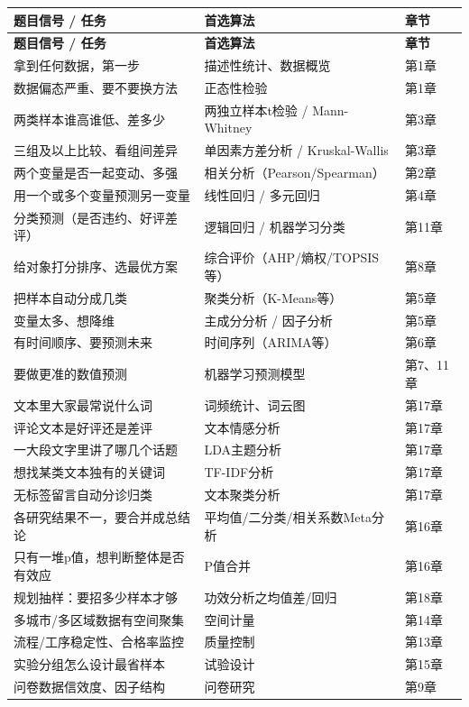 \begin{longtable}{p{4.2cm} p{6.2cm} p{2.6cm}}
\rowcolor{algoBlue!15}
\textbf{题目信号 / 任务} & \textbf{首选算法} & \textbf{章节} \\
\endfirsthead
\rowcolor{algoBlue!15}
\textbf{题目信号 / 任务} & \textbf{首选算法} & \textbf{章节} \\
\endhead

拿到任何数据，第一步 & 描述性统计、数据概览 & 第1章 \\
数据偏态严重、要不要换方法 & 正态性检验 & 第1章 \\
两类样本谁高谁低、差多少 & 两独立样本t检验 / Mann-Whitney & 第3章 \\
三组及以上比较、看组间差异 & 单因素方差分析 / Kruskal-Wallis & 第3章 \\
两个变量是否一起变动、多强 & 相关分析（Pearson/Spearman） & 第2章 \\
用一个或多个变量预测另一变量 & 线性回归 / 多元回归 & 第4章 \\
分类预测（是否违约、好评差评） & 逻辑回归 / 机器学习分类 & 第11章 \\
给对象打分排序、选最优方案 & 综合评价（AHP/熵权/TOPSIS等） & 第8章 \\
把样本自动分成几类 & 聚类分析（K-Means等） & 第5章 \\
变量太多、想降维 & 主成分分析 / 因子分析 & 第5章 \\
有时间顺序、要预测未来 & 时间序列（ARIMA等） & 第6章 \\
要做更准的数值预测 & 机器学习预测模型 & 第7、11章 \\
文本里大家最常说什么词 & 词频统计、词云图 & 第17章 \\
评论文本是好评还是差评 & 文本情感分析 & 第17章 \\
一大段文字里讲了哪几个话题 & LDA主题分析 & 第17章 \\
想找某类文本独有的关键词 & TF-IDF分析 & 第17章 \\
无标签留言自动分诊归类 & 文本聚类分析 & 第17章 \\
各研究结果不一，要合并成总结论 & 平均值/二分类/相关系数Meta分析 & 第16章 \\
只有一堆p值，想判断整体是否有效应 & P值合并 & 第16章 \\
规划抽样：要招多少样本才够 & 功效分析之均值差/回归 & 第18章 \\
多城市/多区域数据有空间聚集 & 空间计量 & 第14章 \\
流程/工序稳定性、合格率监控 & 质量控制 & 第13章 \\
实验分组怎么设计最省样本 & 试验设计 & 第15章 \\
问卷数据信效度、因子结构 & 问卷研究 & 第9章 \\
\end{longtable}

